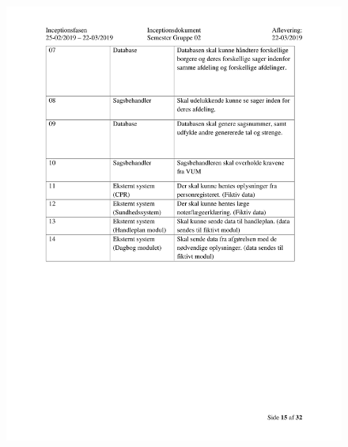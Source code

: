 \begin{figure}[hb]
  \includegraphics[scale = 0.33]{./PNG/Inceptions/Gruppe02+InceptionsDokument-16.jpg} 
\end{figure}

